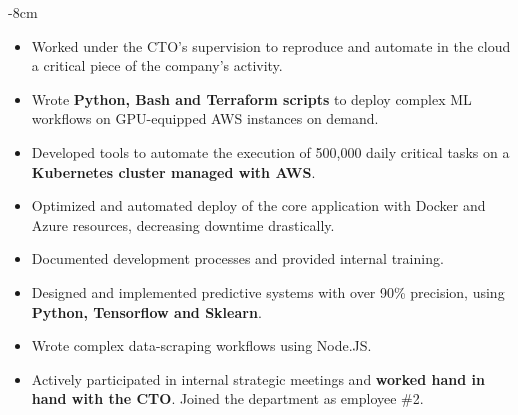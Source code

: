 \documentclass[10pt,a4paper]{altacv}
\begin{document}


\begin{adjustwidth}{}{-8cm}
\makecvheader
\end{adjustwidth}


\begin{itemize}
\item Worked under the CTO's supervision to reproduce and automate in the cloud a critical piece of the company's activity.
\item Wrote \textbf{Python, Bash and Terraform scripts} to deploy complex ML workflows on GPU-equipped AWS instances on demand.
\end{itemize}

\divider

\begin{itemize}
\item Developed tools to automate the execution of 500,000 daily critical tasks on a \textbf{Kubernetes cluster managed with AWS}.
\item Optimized and automated deploy of the core application with Docker and Azure resources, decreasing downtime drastically.
\item Documented development processes and provided internal training.
\item Designed and implemented predictive systems with over 90\% precision, using \textbf{Python, Tensorflow and Sklearn}.
\item Wrote complex data-scraping workflows using Node.JS.
\item Actively participated in internal strategic meetings and \textbf{worked hand in hand with the CTO}. Joined the department as employee \#2.
\end{itemize}
\end{document}
